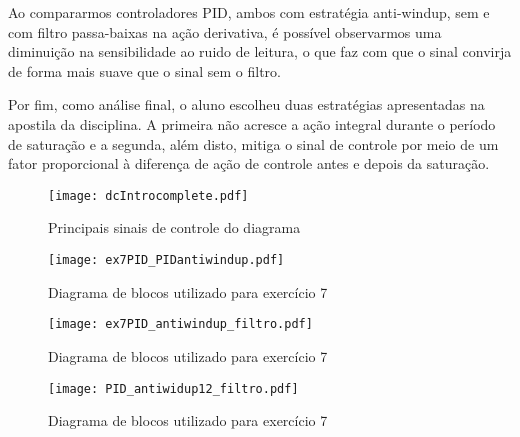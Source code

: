 Ao compararmos controladores PID, ambos com estratégia anti-windup, sem e com filtro passa-baixas na ação derivativa, é possível observarmos uma diminuição na sensibilidade ao ruido de leitura, o que faz com que o sinal convirja de forma mais suave que o sinal sem o filtro.

Por fim, como análise final, o aluno escolheu duas estratégias apresentadas na apostila da disciplina. A primeira não acresce a ação integral durante o período de saturação e a segunda, além disto, mitiga o sinal de controle por meio de um fator proporcional à diferença de ação de controle antes e depois da saturação. 

\begin{figure}[!h]
    \center
    \texttt{[image: dcIntrocomplete.pdf]}
    \caption{Principais sinais de controle do diagrama} 
    \label{fig:dcIntrocomplete}
\end{figure}

\begin{figure}[H]
    \center
    \texttt{[image: ex7PID\_PIDantiwindup.pdf]}
    \caption{Diagrama de blocos utilizado para exercício 7}
    \label{fig:PIDantiwindup}
\end{figure}

\begin{figure}[H]
    \center
    \texttt{[image: ex7PID\_antiwindup\_filtro.pdf]}
    \caption{Diagrama de blocos utilizado para exercício 7}
    \label{fig:PIDfiltro}
\end{figure}

\begin{figure}[H]
    \center
    \texttt{[image: PID\_antiwidup12\_filtro.pdf]}
    \caption{Diagrama de blocos utilizado para exercício 7}
    \label{fig:PIDantiwindup12}
\end{figure}
